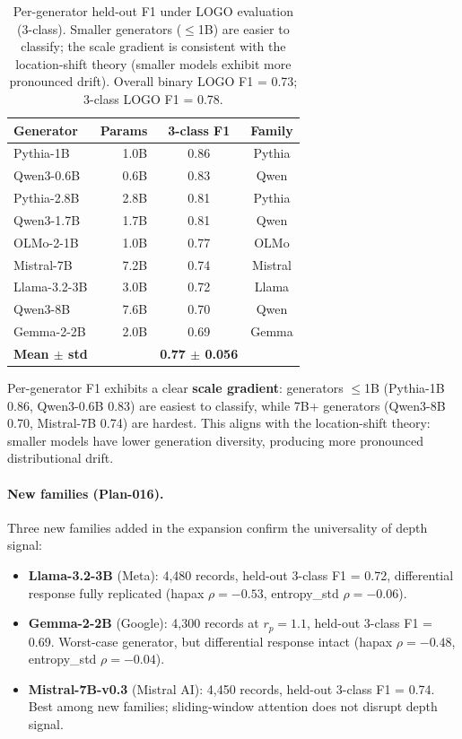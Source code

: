 \documentclass[11pt,a4paper]{article}
\begin{document}
\begin{table}[t]
\centering
\small
\begin{tabular}{lrcc}
\toprule
\textbf{Generator} & \textbf{Params} & \textbf{3-class F1} & \textbf{Family} \\
\midrule
Pythia-1B      & 1.0B & 0.86 & Pythia \\
Qwen3-0.6B    & 0.6B & 0.83 & Qwen \\
Pythia-2.8B    & 2.8B & 0.81 & Pythia \\
Qwen3-1.7B    & 1.7B & 0.81 & Qwen \\
OLMo-2-1B     & 1.0B & 0.77 & OLMo \\
Mistral-7B     & 7.2B & 0.74 & Mistral \\
Llama-3.2-3B   & 3.0B & 0.72 & Llama \\
Qwen3-8B       & 7.6B & 0.70 & Qwen \\
Gemma-2-2B     & 2.0B & 0.69 & Gemma \\
\midrule
\textbf{Mean $\pm$ std} & & \textbf{0.77 $\pm$ 0.056} & \\
\bottomrule
\end{tabular}
\caption{Per-generator held-out F1 under LOGO evaluation (3-class). Smaller generators ($\leq$1B) are easier to classify; the scale gradient is consistent with the location-shift theory (smaller models exhibit more pronounced drift). Overall binary LOGO F1 = 0.73; 3-class LOGO F1 = 0.78.}
\label{tab:logo}
\end{table}

Per-generator F1 exhibits a clear \textbf{scale gradient}: generators $\leq$1B (Pythia-1B 0.86, Qwen3-0.6B 0.83) are easiest to classify, while 7B+ generators (Qwen3-8B 0.70, Mistral-7B 0.74) are hardest. This aligns with the location-shift theory: smaller models have lower generation diversity, producing more pronounced distributional drift.

\paragraph{New families (Plan-016).}
Three new families added in the expansion confirm the universality of depth signal:
\begin{itemize}
    \item \textbf{Llama-3.2-3B} (Meta): 4,480 records, held-out 3-class F1 = 0.72, differential response fully replicated (hapax $\rho = -0.53$, entropy\_std $\rho = -0.06$).
    \item \textbf{Gemma-2-2B} (Google): 4,300 records at $r_p = 1.1$, held-out 3-class F1 = 0.69. Worst-case generator, but differential response intact (hapax $\rho = -0.48$, entropy\_std $\rho = -0.04$).
    \item \textbf{Mistral-7B-v0.3} (Mistral AI): 4,450 records, held-out 3-class F1 = 0.74. Best among new families; sliding-window attention does not disrupt depth signal.
\end{itemize}
\end{document}
